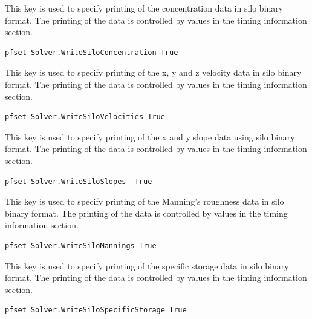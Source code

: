 {
This key is used to specify printing of the concentration data in silo binary format.
The printing of the data is controlled by values in the
timing information section.
}
\begin{display}\begin{verbatim}
pfset Solver.WriteSiloConcentration True
\end{verbatim}\end{display}

{
This key is used to specify printing of the x, y and z
velocity data in silo binary format.  The printing of the data is controlled by
values in the timing information section.
}
\begin{display}\begin{verbatim}
pfset Solver.WriteSiloVelocities True
\end{verbatim}\end{display}

{
This key is used to specify printing of the x and y slope data using silo binary format.
The printing of the data is controlled by values in the
timing information section.
}
\begin{display}\begin{verbatim}
pfset Solver.WriteSiloSlopes  True
\end{verbatim}\end{display}

{
This key is used to specify printing of the Manning's roughness data in silo binary format.
The printing of the data is controlled by values in the
timing information section.
}
\begin{display}\begin{verbatim}
pfset Solver.WriteSiloMannings True
\end{verbatim}\end{display}

{
This key is used to specify printing of the specific storage data in silo binary format.
The printing of the data is controlled by values in the
timing information section.
}
\begin{display}\begin{verbatim}
pfset Solver.WriteSiloSpecificStorage True
\end{verbatim}\end{display}

